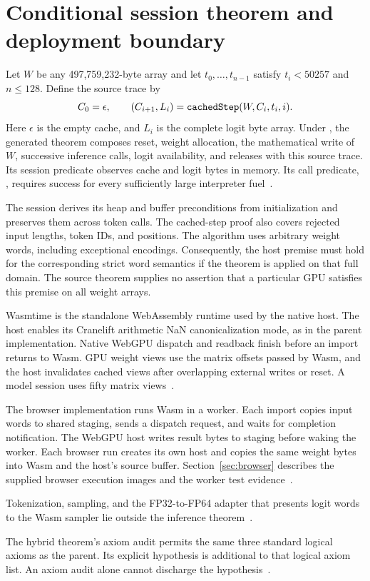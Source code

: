 \section{Conditional session theorem and deployment boundary}
\label{sec:hybrid}

Let $W$ be any 497,759,232-byte array and let $t_0,\ldots,t_{n-1}$ satisfy $t_i<50257$ and $n\leq128$.  Define the source trace by
\[
C_0=\epsilon,\qquad (C_{i+1},L_i)=\texttt{cachedStep}(W,C_i,t_i,i).
\]
Here $\epsilon$ is the empty cache, and $L_i$ is the complete logit byte array.  Under , the generated  theorem composes reset, weight allocation, the mathematical write of $W$, successive inference calls, logit availability, and releases with this source trace.  Its session predicate observes cache and logit bytes in memory.  Its call predicate, , requires success for every sufficiently large interpreter fuel~\cite{wg-composition,wg-session}.

The session derives its heap and buffer preconditions from initialization and preserves them across token calls.  The cached-step proof also covers rejected input lengths, token IDs, and positions.  The algorithm uses arbitrary weight words, including exceptional encodings.  Consequently, the host premise must hold for the corresponding strict word semantics if the theorem is applied on that full domain.  The source theorem supplies no assertion that a particular GPU satisfies this premise on all weight arrays.

Wasmtime is the standalone WebAssembly runtime used by the native host.  The host enables its Cranelift arithmetic NaN canonicalization mode, as in the parent implementation.  Native WebGPU dispatch and readback finish before an import returns to Wasm.  GPU weight views use the matrix offsets passed by Wasm, and the host invalidates cached views after overlapping external writes or reset.  A model session uses fifty matrix views~\cite{wg-host}.

The browser implementation runs Wasm in a worker.  Each import copies input words to shared staging, sends a dispatch request, and waits for completion notification.  The WebGPU host writes result bytes to staging before waking the worker.  Each browser run creates its own host and copies the same weight bytes into Wasm and the host's source buffer.  Section~\ref{sec:browser} describes the supplied browser execution images and the worker test evidence~\cite{wg-host,wg-journal}.

Tokenization, sampling, and the FP32-to-FP64 adapter that presents logit words to the Wasm sampler lie outside the inference theorem~\cite{wg-build}.

The hybrid theorem's axiom audit permits the same three standard logical axioms as the parent.  Its explicit  hypothesis is additional to that logical axiom list.  An axiom audit alone cannot discharge the hypothesis~\cite{wg-composition}.

